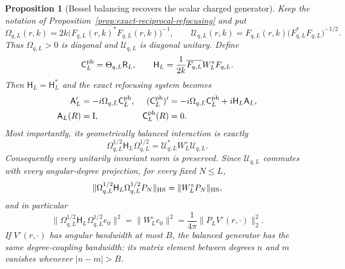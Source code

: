 \documentclass[11pt]{article}
\newcommand{\Id}{\mathrm I}
\newtheorem{proposition}[theorem]{Proposition}
\theoremstyle{definition}
\theoremstyle{remark}
\begin{document}
\begin{proposition}[Bessel balancing recovers the scalar charged generator]
\label{prop:bessel-balanced-refocusing-generator}
Keep the notation of Proposition~\ref{prop:exact-reciprocal-refocusing} and put
\begin{equation}
 \Omega_{q,L}(r,k)=2k\bigl(F_{q,L}(r,k)^*F_{q,L}(r,k)\bigr)^{-1},
 \qquad
 \mathcal U_{q,L}(r,k)=F_{q,L}(r,k)
  \bigl(F_{q,L}^*F_{q,L}\bigr)^{-1/2}.
 \label{eq:bessel-balanced-omega-phase}
\end{equation}
Thus $\Omega_{q,L}>0$ is diagonal and $\mathcal U_{q,L}$ is diagonal unitary.
Define
\begin{equation}
 \mathsf C_L^{\rm ph}=\Theta_{q,L}\mathsf R_L,
 \qquad
 \mathsf H_L=\frac1{2k}\overline{F_{q,L}}W_L^\circ F_{q,L}.
 \label{eq:physical-return-and-H}
\end{equation}
Then $\mathsf H_L=\mathsf H_L^*$ and the exact refocusing system becomes
\begin{align}
 \mathsf A_L'&=-i\Omega_{q,L}\mathsf C_L^{\rm ph},
 &
 (\mathsf C_L^{\rm ph})'
 &=-i\Omega_{q,L}\mathsf C_L^{\rm ph}+i\mathsf H_L\mathsf A_L,
 \label{eq:bessel-balanced-refocusing-system}\\
 \mathsf A_L(R)&=\Id,
 &\mathsf C_L^{\rm ph}(R)&=0.
\end{align}
Most importantly, its geometrically balanced interaction is exactly
\begin{equation}
 \boxed{
 \Omega_{q,L}^{1/2}\mathsf H_L\Omega_{q,L}^{1/2}
 =\mathcal U_{q,L}^*W_L^\circ\mathcal U_{q,L}.}
 \label{eq:exact-bessel-balanced-generator}
\end{equation}
Consequently every unitarily invariant norm is preserved.  Since
$\mathcal U_{q,L}$ commutes with every angular-degree projection, for every
fixed $N\leq L$,
\begin{equation}
 \|\Omega_{q,L}^{1/2}\mathsf H_L\Omega_{q,L}^{1/2}P_N\|_{\rm HS}
 =\|W_L^\circ P_N\|_{\rm HS},
 \label{eq:balanced-low-column-isometry}
\end{equation}
and in particular
\begin{equation}
 \|\Omega_{q,L}^{1/2}\mathsf H_L\Omega_{q,L}^{1/2}e_0\|^2
 =\|W_L^\circ e_0\|^2
 =\frac1{4\pi}\|P_LV^\circ(r,\cdot)\|_2^2.
 \label{eq:balanced-constant-column-cost}
\end{equation}
If $V^\circ(r,\cdot)$ has angular bandwidth at most $B$, the balanced
generator has the same degree-coupling bandwidth: its matrix element between
degrees $n$ and $m$ vanishes whenever $|n-m|>B$.
\end{proposition}
\end{document}
